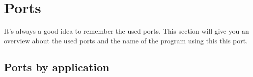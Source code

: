 

\section{Ports}

It's always a good idea to remember the used ports. This section will give
you an overview about the used ports and the name of the program using this
this port.

\subsection{Ports by application}

